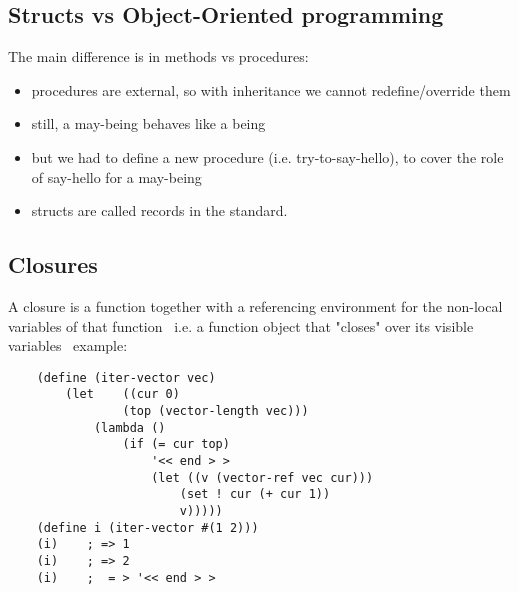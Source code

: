 \subsection{Structs vs Object-Oriented programming}
The main difference is in methods vs procedures:
\begin{itemize}
    \item procedures are external, so with inheritance we cannot redefine/override them
    \item still, a may-being behaves like a being
    \item but we had to define a new procedure (i.e. try-to-say-hello), to cover the role of say-hello for a may-being
    \item structs are called records in the standard.
\end{itemize}


\subsection{Closures}
A closure is a function together with a referencing environment for the
non-local variables of that function \
i.e. a function object that "closes" over its visible variables \
example:
\begin{lstlisting}
    (define (iter-vector vec)
        (let    ((cur 0)
                (top (vector-length vec)))
            (lambda ()
                (if (= cur top)
                    '<< end > >
                    (let ((v (vector-ref vec cur)))
                        (set ! cur (+ cur 1))
                        v)))))
    (define i (iter-vector #(1 2)))
    (i)    ; => 1
    (i)    ; => 2
    (i)    ;  = > '<< end > >
\end{lstlisting}


